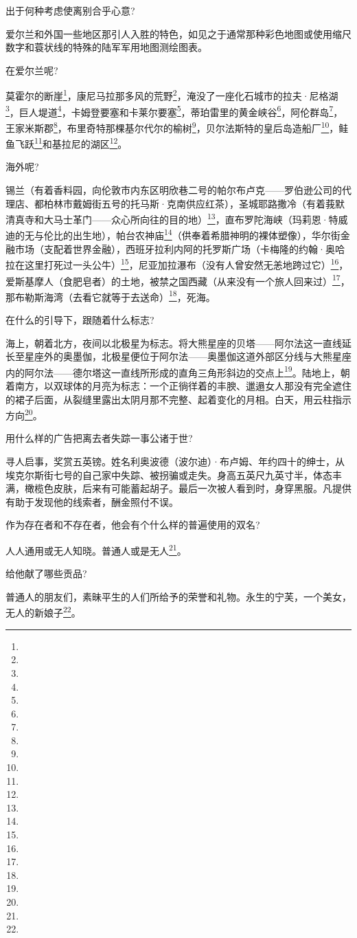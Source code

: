 \par 出于何种考虑使离别合乎心意?
\par 爱尔兰和外国一些地区那引人入胜的特色，如见之于通常那种彩色地图或使用缩尺数字和蓑状线的特殊的陆军军用地图测绘图表。
\par 在爱尔兰呢?
\par 莫霍尔的断崖\footnote{}，康尼马拉那多风的荒野\footnote{}，淹没了一座化石城市的拉夫·尼格湖\footnote{}，巨人堤道\footnote{}，卡姆登要塞和卡莱尔要塞\footnote{}，蒂珀雷里的黄金峡谷\footnote{}，阿伦群岛\footnote{}，王家米斯郡\footnote{}，布里奇特那棵基尔代尔的榆树\footnote{}，贝尔法斯特的皇后岛造船厂\footnote{}，鲑鱼飞跃\footnote{}和基拉尼的湖区\footnote{}。
\par 海外呢?
\par 锡兰（有着香料园，向伦敦市内东区明欣巷二号的帕尔布卢克——罗伯逊公司的代理店、都柏林市戴姆街五号的托马斯·克南供应红茶），圣城耶路撒冷（有着莪默清真寺和大马士革门——众心所向往的目的地）\footnote{}，直布罗陀海峡（玛莉恩·特威迪的无与伦比的出生地），帕台农神庙\footnote{}（供奉着希腊神明的裸体塑像），华尔街金融市场（支配着世界金融），西班牙拉利内阿的托罗斯广场（卡梅隆的约翰·奥哈拉在这里打死过一头公牛）\footnote{}，尼亚加拉瀑布（没有人曾安然无恙地跨过它）\footnote{}，爱斯基摩人（食肥皂者）的土地，被禁之国西藏（从来没有一个旅人回来过）\footnote{}，那布勒斯海湾（去看它就等于去送命）\footnote{}，死海。
\par 在什么的引导下，跟随着什么标志?
\par 海上，朝着北方，夜间以北极星为标志。将大熊星座的贝塔——阿尔法这一直线延长至星座外的奥墨伽，北极星便位于阿尔法——奥墨伽这道外部区分线与大熊星座内的阿尔法——德尔塔这一直线所形成的直角三角形斜边的交点上\footnote{}。陆地上，朝着南方，以双球体的月亮为标志：一个正徜徉着的丰腴、邋遢女人那没有完全遮住的裙子后面，从裂缝里露出太阴月那不完整、起着变化的月相。白天，用云柱指示方向\footnote{}。
\par 用什么样的广告把离去者失踪一事公诸于世?
\par 寻人启事，奖赏五英镑。姓名利奥波德（波尔迪）·布卢姆、年约四十的绅士，从埃克尔斯街七号的自己家中失踪、被拐骗或走失。身高五英尺九英寸半，体态丰满，橄榄色皮肤，后来有可能蓄起胡子。最后一次被人看到时，身穿黑服。凡提供有助于发现他的线索者，酬金照付不误。
\par 作为存在者和不存在者，他会有个什么样的普遍使用的双名?
\par 人人通用或无人知晓。普通人或是无人\footnote{}。
\par 给他献了哪些贡品?
\par 普通人的朋友们，素昧平生的人们所给予的荣誉和礼物。永生的宁芙，一个美女，无人的新娘子\footnote{}。
